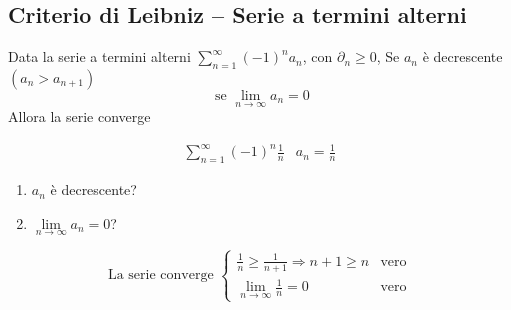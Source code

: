 \subsection{Criterio di Leibniz -- Serie a termini alterni\label{leibniz}}
Data la serie a termini alterni $\displaystyle\sum_{n=1}^\infty(-1)^na_n$, con 
$\partial_n\geq 0$, Se $a_n$ è decrescente $(a_n> a_{n+1})$
\begin{equation*}
	\text{ se }\lim_{n\to\infty} a_n=0
\end{equation*}
Allora la serie converge
\begin{esempio}
  \begin{eqnarray*}
    \displaystyle\sum_{n=1}^\infty (-1)^n\frac{1}{n} & a_n=\frac{1}{n}
  \end{eqnarray*}
  \begin{enumerate}
  \item $a_n$ è decrescente?
  \item $\lim\limits_{n\to\infty} a_n=0$?
  \end{enumerate}
  \begin{equation*}
    \text{La serie converge } \begin{cases}
                                \frac{1}{n}\geq \frac{1}{n+1} \Rightarrow n+1\geq n
                                & \text{vero}\\
                                \lim\limits_{n\to\infty} \frac{1}{n}=0 & \text{vero}
                              \end{cases}
  \end{equation*}                          
\end{esempio}
\clearpage
